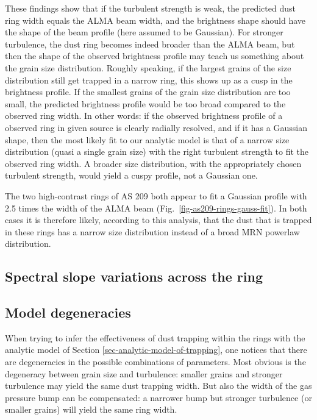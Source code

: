 \documentclass{aa}
\begin{document}
These findings show that if the turbulent strength is weak, the predicted dust
ring width equals the ALMA beam width, and the brightness shape should have the
shape of the beam profile (here assumed to be Gaussian). For stronger
turbulence, the dust ring becomes indeed broader than the ALMA beam, but then
the shape of the observed brightness profile may teach us something about the
grain size distribution. Roughly speaking, if the largest grains of the size
distribution still get trapped in a narrow ring, this shows up as a cusp in the
brightness profile. If the smallest grains of the grain size distribution are
too small, the predicted brightness profile would be too broad compared to the
observed ring width. In other words: if the observed brightness profile of a
observed ring in given source is clearly radially resolved, and if it has a
Gaussian shape, then the most likely fit to our analytic model is that of
a narrow size distribution (quasi a single grain size) with the right turbulent
strength to fit the observed ring width. A broader size distribution, with the
appropriately chosen turbulent strength, would yield a cuspy profile, not a
Gaussian one.

The two high-contrast rings of AS 209 both appear to fit a Gaussian profile with
2.5 times the width of the ALMA beam (Fig.~\ref{fig-as209-rings-gauss-fit}). In
both cases it is therefore likely, according to this analysis, that the dust
that is trapped in these rings has a narrow size distribution instead of a broad
MRN powerlaw distribution.

\subsection{Spectral slope variations across the ring}
\label{sec-anmodel-slope-variations}
%





\subsection{Model degeneracies}
\label{sec-anmodel-degeneracies}
%
When trying to infer the effectiveness of dust trapping within the rings with
the analytic model of Section \ref{sec-analytic-model-of-trapping}, one notices
that there are degeneracies in the possible combinations of parameters. Most
obvious is the degeneracy between grain size and turbulence: smaller grains
and stronger turbulence may yield the same dust trapping width. But also the
width of the gas pressure bump can be compensated: a narrower bump but stronger
turbulence (or smaller grains) will yield the same ring width.
\end{document}
